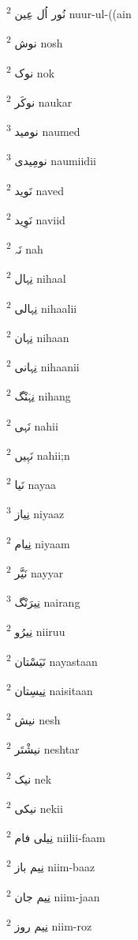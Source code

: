 \documentclass[12pt]{article}
\begin{document}
\begin{multicols}{5}
{\ur نُور اُل عِین}   \textsuperscript{2} nuur-ul-((ain

{\ur نوش}   \textsuperscript{2} nosh

{\ur نوک}   \textsuperscript{2} nok

{\ur نوکَر}   \textsuperscript{2} naukar

{\ur نومید}   \textsuperscript{3} naumed

{\ur نومِیدی}   \textsuperscript{3} naumiidii

{\ur نَوید}   \textsuperscript{2} naved

{\ur نَوِید}   \textsuperscript{2} naviid

{\ur نَہ}   \textsuperscript{2} nah

{\ur نِہال}   \textsuperscript{2} nihaal

{\ur نِہالی}   \textsuperscript{2} nihaalii

{\ur نِہان}   \textsuperscript{2} nihaan

{\ur نِہانی}   \textsuperscript{2} nihaanii

{\ur نِہَنْگ}   \textsuperscript{2} nihang

{\ur نَہی}   \textsuperscript{2} nahii

{\ur نَہِیں}   \textsuperscript{2} nahii;n

{\ur نَیا}   \textsuperscript{2} nayaa

{\ur نِیاز}   \textsuperscript{3} niyaaz

{\ur نِیام}   \textsuperscript{2} niyaam

{\ur نَیَّر}   \textsuperscript{2} nayyar

{\ur نِیرَنْگ}   \textsuperscript{3} nairang

{\ur نِیرُو}   \textsuperscript{2} niiruu

{\ur نَیَسْتان}   \textsuperscript{2} nayastaan

{\ur نِیسِتان}   \textsuperscript{2} naisitaan

{\ur نیش}   \textsuperscript{2} nesh

{\ur نیشْتَر}   \textsuperscript{2} neshtar

{\ur نیک}   \textsuperscript{2} nek

{\ur نیکی}   \textsuperscript{2} nekii

{\ur نِیلی فام}   \textsuperscript{2} niilii-faam

{\ur نِیم باز}   \textsuperscript{2} niim-baaz

{\ur نِیم جان}   \textsuperscript{2} niim-jaan

{\ur نِیم روز}   \textsuperscript{2} niim-roz


\end{multicols}
\end{document}

